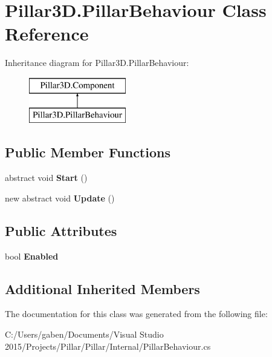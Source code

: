 \hypertarget{class_pillar3_d_1_1_pillar_behaviour}{}\section{Pillar3\+D.\+Pillar\+Behaviour Class Reference}
\label{class_pillar3_d_1_1_pillar_behaviour}
Inheritance diagram for Pillar3\+D.\+Pillar\+Behaviour\+:\begin{figure}[H]
\begin{center}
\leavevmode
\includegraphics[height=2.000000cm]{class_pillar3_d_1_1_pillar_behaviour}
\end{center}
\end{figure}
\subsection*{Public Member Functions}
\begin{DoxyCompactItemize}
\item 
\mbox{\label{class_pillar3_d_1_1_pillar_behaviour_acef99bf3d04dc732634e9421d2753951}} 
abstract void {\bfseries Start} ()
\item 
\mbox{\label{class_pillar3_d_1_1_pillar_behaviour_a95e4d79c0e81bb2fbb672b36efcde868}} 
new abstract void {\bfseries Update} ()
\end{DoxyCompactItemize}
\subsection*{Public Attributes}
\begin{DoxyCompactItemize}
\item 
\mbox{\label{class_pillar3_d_1_1_pillar_behaviour_ae80f907c2796c63c4834b866b8468868}} 
bool {\bfseries Enabled}
\end{DoxyCompactItemize}
\subsection*{Additional Inherited Members}


The documentation for this class was generated from the following file\+:\begin{DoxyCompactItemize}
\item 
C\+:/\+Users/gaben/\+Documents/\+Visual Studio 2015/\+Projects/\+Pillar/\+Pillar/\+Internal/Pillar\+Behaviour.\+cs\end{DoxyCompactItemize}
